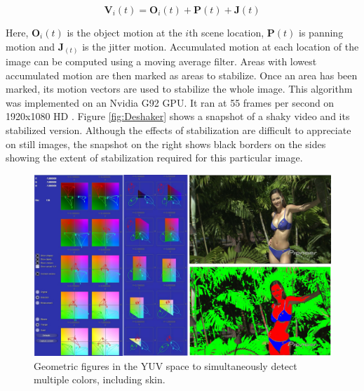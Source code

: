 \documentclass[12pt,letterpaper,doublespaced,ETD,proposal]{gt-ece-thesis}
\begin{document}
\begin{Body}
\begin{equation}
\mathbf{V}_i(t) = \mathbf{O}_i(t) + \mathbf{P}(t) + \mathbf{J}(t)
\end{equation}  

Here, $\mathbf{O}_i(t)$ is the object motion at the $i$th scene location, $\mathbf{P}(t)$ is panning motion and $\mathbf{J}_(t)$ is the jitter motion.  Accumulated motion at each location of the image can be computed using a moving average filter.  Areas with lowest accumulated motion are then marked as areas to stabilize.  Once an area has been marked, its motion vectors are used to stabilize the whole image.  This algorithm was implemented on an Nvidia G92 GPU.  It ran at 55 frames per second on 1920x1080 HD \cite{2009_TECH_VideoStabilization_Arici}.  Figure \ref{fig:Deshaker} shows a snapshot of a shaky video and its stabilized version.  Although the effects of stabilization are difficult to appreciate on still images, the snapshot on the right shows black borders on the sides showing the extent of stabilization required for this particular image.

			\begin{figure}		
					\centering		
					\includegraphics[width=1.0\textwidth]{figs/Proposal_fig14_TRK_colorDetection}
					\caption{Geometric figures in the YUV space to simultaneously detect multiple colors, including skin.}
					\label{fig:color_detection}
			\end{figure}
			

\end{Body}
\end{document}
